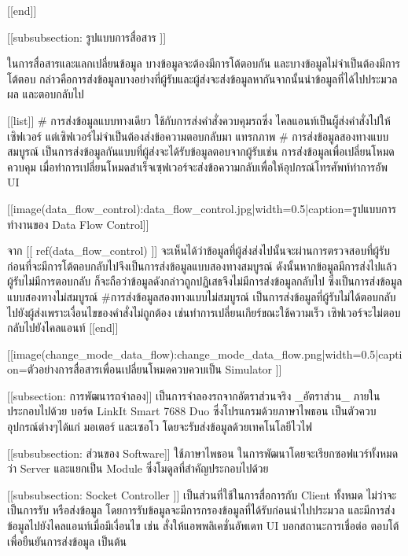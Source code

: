 			[[end]]																

			[[subsubsection: รูปแบบการสื่อสาร ]]

			ในการสื่อสารและแลกเปลี่ยนข้อมูล บางข้อมูลจะต้องมีการโต้ตอบกัน และบางข้อมูลไม่จำเป็นต้องมีการโต้ตอบ กล่าวคือการส่งข้อมูลบางอย่างที่ผู้รับและผู้ส่งจะส่งข้อมูลหากันจากนั้นนำข้อมูลที่ได้ไปประมวลผล และตอบกลับไป 
					
				[[list]]
					# การส่งข้อมูลแบบทางเดียว ใช้กับการส่งคำสั่งควบคุมรถซึ่ง ไคลแอนท์เป็นผู็ส่งคำสั่งไปให้เซิฟเวอร์  แต่เซิฟเวอร์ไม่จำเป็นต้องส่งข้อความตอบกลับมา
					แทรกภาพ		
					# การส่งข้อมูลสองทางแบบสมบูรณ์ เป็นการส่งข้อมูลกันแบบที่ผู้ส่งจะได้รับข้อมูลตอบจากผู้รับเช่น การส่งข้อมูลเพื่อเปลี่ยนโหมดควบคุม เมื่อทำการเปลี่ยนโหมดสำเร็จเซฺฟเวอร์จะส่งข้อความกลับเพื่อให้อุปกรณ์โทรศัพท์ทำการอัพ UI 

					[[image(data_flow_control):data_flow_control.jpg|width=0.5|caption=รูปแบบการทำงานของ Data Flow Control]]

			 		จาก [[ ref(data_flow_control) ]] จะเห็นได้ว่าข้อมูลที่ผู้ส่งส่งไปนั้นจะผ่านการตรวจสอบที่ผู้รับก่อนที่จะมีการโต้ตอบกลับไปจึงเป็นการส่งข้อมูลแบบสองทางสมบูรณ์  ดังนั้นหากข้อมูลมีการส่งไปแล้วผู้รับไม่มีการตอบกลับ ก็จะถือว่าข้อมูลดังกล่าวถูกปฏิเสธจึงไม่มีการส่งข้อมูลกลับไป ซึ่งเป็นการส่งข้อมูลแบบสองทางไม่สมบูรณ์ 		
					#การส่งข้อมูลสองทางแบบไม่สมบูรณ์ เป็นการส่งข้อมูลที่ผู้รับไม่ได้ตอบกลับไปยังผู้ส่งเพราะเงื่อนไขของคำสั่งไม่ถูกต้อง เช่นทำการเปลี่ยนเกียร์ขณะใช้ความเร็ว เซิฟเวอร์จะไม่ตอบกลับไปยังไคลแอนท์		
				[[end]]

			[[image(change_mode_data_flow):change_mode_data_flow.png|width=0.5|caption=ตัวอย่างการสื่อสารเพื่อนเปลี่ยนโหมดควบควบเป็น Simulator ]]


	[[subsection: การพัฒนารถจำลอง]]    
	    เป็นการจำลองรถจากอัตราส่วนจริง  _อัตราส่วน_ ภายในประกอบไปด้วย บอร์ด LinkIt Smart 7688 Duo ซึ่งโปรแกรมด้วยภาษาไพธอน เป็นตัวควบอุปกรณ์ต่างๆได้แก่ มอเตอร์ และเซอโว โดยจะรับส่งข้อมูลด้วยเทคโนโลยีไวไฟ

		[[subsubsection: ส่วนของ Software]]
			ใช้ภาษาไพธอน ในการพัฒนาโดยจะเรียกซอฟแวร์ทั้งหมดว่า Server และแยกเป็น Module ซึ่งโมดูลที่สำคัญประกอบไปด้วย

	 	   	[[subsubsection: Socket Controller ]]
	            เป็นส่วนที่ใช้ในการสื่อการกับ Client ทั้งหมด ไม่ว่าจะเป็นการรับ หรือส่งข้อมูล โดยการรับข้อมูลจะมีการกรองข้อมูลที่ได้รับก่อนนำไปประมวล และมีการส่งข้อมูลไปยังไคลแอนท์เมื่อมีเงื่อนไข เช่น สั่งให้แอพพลิเคชั่นอัพเดท UI บอกสถานะการเชื่อต่อ ตอบโต้เพื่อยืนยันการส่งข้อมูล เป็นต้น             %

